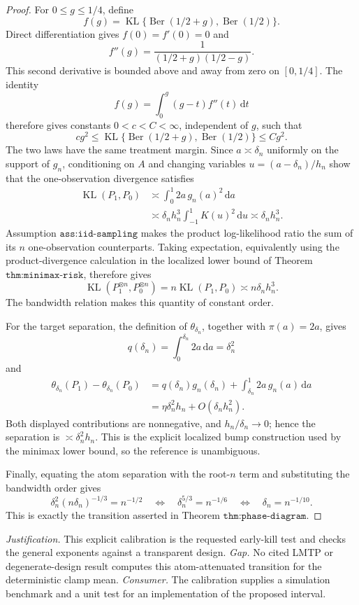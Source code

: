 \documentclass{article}
\begin{document}
\begin{proof}
For \(0\leq g\leq1/4\), define
\[
 f(g)=\operatorname{KL}\{\operatorname{Ber}(1/2+g),\operatorname{Ber}(1/2)\}.
\]
Direct differentiation gives \(f(0)=f'(0)=0\) and
\[
 f''(g)=\frac{1}{(1/2+g)(1/2-g)}.
\]
This second derivative is bounded above and away from zero on \([0,1/4]\).  The identity
\[
 f(g)=\int_0^g(g-t)f''(t)\,\mathrm dt
\]
therefore gives constants \(0<c<C<\infty\), independent of \(g\), such that
\[
 c g^2\leq
 \operatorname{KL}\{\operatorname{Ber}(1/2+g),\operatorname{Ber}(1/2)\}
 \leq Cg^2.
\]
The two laws have the same treatment margin.  Since \(a\asymp\delta_n\) uniformly on the support of \(g_n\), conditioning on \(A\) and changing variables \(u=(a-\delta_n)/h_n\) show that the one-observation divergence satisfies
\[
 \begin{aligned}
 \operatorname{KL}(P_1,P_0)
 &\asymp \int_0^1 2a\,g_n(a)^2\,\mathrm da \\
 &\asymp \delta_n h_n^3
 \int_{-1}^1K(u)^2\,\mathrm du
 \asymp\delta_nh_n^3.
 \end{aligned}
\]
Assumption \(\texttt{ass:iid-sampling}\) makes the product log-likelihood ratio the sum of its \(n\) one-observation counterparts.  Taking expectation, equivalently using the product-divergence calculation in the localized lower bound of Theorem \(\texttt{thm:minimax-risk}\), therefore gives
\[
 \operatorname{KL}(P_1^{\otimes n},P_0^{\otimes n})
 =n\operatorname{KL}(P_1,P_0)
 \asymp n\delta_nh_n^3.
\]
The bandwidth relation makes this quantity of constant order.

For the target separation, the definition of \(\theta_{\delta_n}\), together with \(\pi(a)=2a\), gives
\[
 q(\delta_n)=\int_0^{\delta_n}2a\,\mathrm da=\delta_n^2
\]
and
\[
 \begin{aligned}
 \theta_{\delta_n}(P_1)-\theta_{\delta_n}(P_0)
 &=q(\delta_n)g_n(\delta_n)
   +\int_{\delta_n}^1 2a\,g_n(a)\,\mathrm da \\
 &=\eta\delta_n^2h_n+O(\delta_nh_n^2).
 \end{aligned}
\]
Both displayed contributions are nonnegative, and \(h_n/\delta_n\to0\); hence the separation is \(\asymp\delta_n^2h_n\).  This is the explicit localized bump construction used by the minimax lower bound, so the reference is unambiguous.

Finally, equating the atom separation with the root-\(n\) term and substituting the bandwidth order gives
\[
 \delta_n^2(n\delta_n)^{-1/3}=n^{-1/2}
 \quad\Longleftrightarrow\quad
 \delta_n^{5/3}=n^{-1/6}
 \quad\Longleftrightarrow\quad
 \delta_n=n^{-1/10}.
\]
This is exactly the transition asserted in Theorem \(\texttt{thm:phase-diagram}\).
\end{proof}
\par\smallskip\noindent \textit{Justification.} This explicit calibration is the requested early-kill test and checks the general exponents against a transparent design. \textit{Gap.} No cited LMTP or degenerate-design result computes this atom-attenuated transition for the deterministic clamp mean. \textit{Consumer.} The calibration supplies a simulation benchmark and a unit test for an implementation of the proposed interval.
\end{document}
